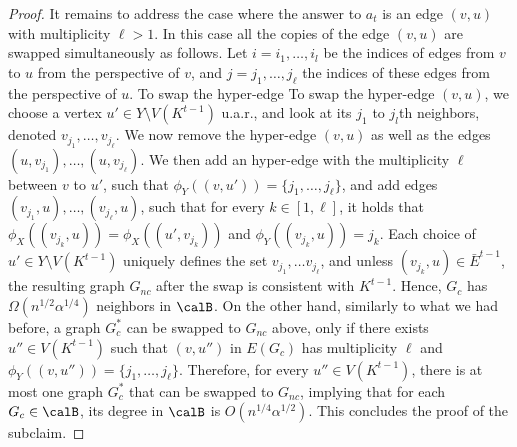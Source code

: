 \begin{proof}
      It remains to address the case where the answer to $a_t$ is an edge $(v,u)$ with multiplicity $\ell>1$.
      In this case all the copies of the edge $(v,u)$ are swapped simultaneously as follows. Let $i=i_1, \ldots, i_l$ be the indices of edges from $v$ to $u$ from the perspective of $v$, and $j=j_1, \ldots, j_{\ell}$ the indices of these edges from the perspective of $u$. To swap the hyper-edge To swap the hyper-edge $(v,u)$, we choose a vertex $u'\in Y\setminus V(K^{t-1})$ u.a.r., and look at its $j_1$ to $j_l$th neighbors,  denoted  $v_{j_1}, \ldots, v_{j_{\ell}}$. We now remove the hyper-edge $(v,u)$ as well as the edges $(u, v_{j_1}), \ldots, (u,v_{j_{\ell}})$. We then  add an hyper-edge with the  multiplicity  $\ell$ between $v$ to $u'$, such that $\phi_Y((v,u'))=\{j_1, \ldots, j_{\ell}\}$, and add edges $(v_{j_1}, u), \ldots, (v_{j_{\ell}}, u)$, such that for every $k\in [1,\ell]$, it holds that  $\phi_X((v_{j_k},u))=\phi_X((u', v_{j_{k}}))$ and $\phi_Y((v_{j_k},u))=j_k$.
      Each choice of $u'\in Y\setminus V(K^{t-1})$ uniquely defines the set $v_{j_1}, \ldots v_{j_\ell}$, and unless $(v_{j_k},u)\in \bar{E}^{t-1}$, the resulting graph $G_{nc}$ after the swap is consistent with $K^{t-1}$. Hence,  $G_c$ has $\Omega(n^{1/2}\alpha^{1/4})$ neighbors in $\calB$.
    On the other hand, similarly to what we had before, a graph $G_{c}^*$ can be swapped to $G_{nc}$ above, only if there exists $u''\in V(K^{t-1})$ such that    $(v,u'')$ in $E(G_{c})$ has multiplicity $\ell$ and $\phi_Y((v,u''))=\{j_1, \ldots, j_{\ell}\}$. Therefore, for every  $u''\in V(K^{t-1})$, there  is at most  one graph $G_c^*$ that can be swapped to $G_{nc}$, implying that for each $G_c\in \calB$, its degree in $\calB$ is $O(n^{1/4}\alpha^{1/2})$. This concludes the proof of the subclaim.




\end{proof}
\fi



